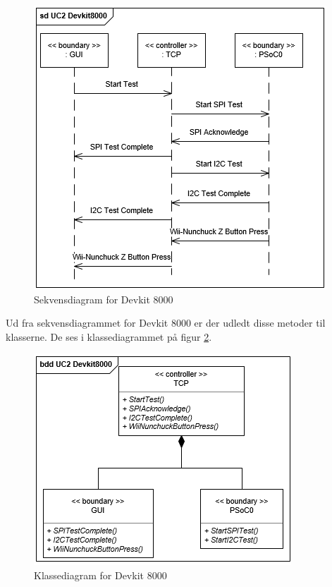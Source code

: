 \begin{figure}[H]
	\centering
	\includegraphics[]{Systemarkitektur/images/DevKit8000SequenceDiagram.png}
	\caption{Sekvensdiagram for Devkit 8000}
	\label{fig:sekvensDevkit}
\end{figure}
Ud fra sekvensdiagrammet for Devkit 8000 er der udledt disse metoder til klasserne. De ses i klassediagrammet på figur \ref{fig:klasseDevkit}. 

\begin{figure}[H]
	\centering
	\includegraphics[] {Systemarkitektur/images/DevKit8000ClassDiagram}
	\caption{Klassediagram for Devkit 8000}
	\label{fig:klasseDevkit}
\end{figure}


